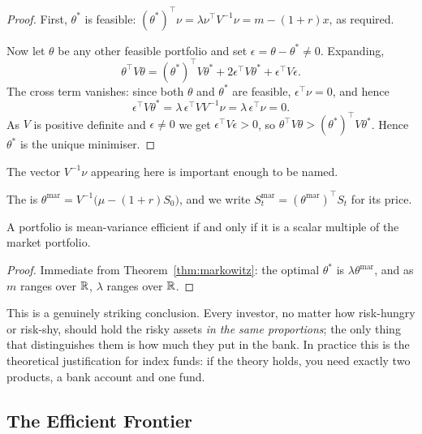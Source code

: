 \documentclass[a4paper]{scrartcl}
\begin{document}
\begin{proof}
	First, $\theta^*$ is feasible: $(\theta^*)^\top \nu = \lambda \nu^\top V^{-1}\nu = m - (1+r)x$, as required.

	Now let $\theta$ be any other feasible portfolio and set $\epsilon = \theta - \theta^* \neq 0$. Expanding,
	$$
	\theta^\top V \theta = (\theta^*)^\top V \theta^* + 2\epsilon^\top V \theta^* + \epsilon^\top V \epsilon.
	$$
	The cross term vanishes: since both $\theta$ and $\theta^*$ are feasible, $\epsilon^\top \nu = 0$, and hence
	$$
	\epsilon^\top V \theta^* = \lambda\, \epsilon^\top V V^{-1}\nu = \lambda\, \epsilon^\top \nu = 0.
	$$
	As $V$ is positive definite and $\epsilon \neq 0$ we get $\epsilon^\top V\epsilon > 0$, so $\theta^\top V\theta > (\theta^*)^\top V\theta^*$. Hence $\theta^*$ is the unique minimiser.
\end{proof}

The vector $V^{-1}\nu$ appearing here is important enough to be named.

\begin{definition}
	The  is $\theta^{\mathrm{mar}} = V^{-1}\big(\mu - (1+r)S_0\big)$, and we write $S_t^{\mathrm{mar}} = (\theta^{\mathrm{mar}})^\top S_t$ for its price.
\end{definition}

\begin{corollary}
	A portfolio is mean-variance efficient if and only if it is a scalar multiple of the market portfolio.
\end{corollary}

\begin{proof}
	Immediate from Theorem~\ref{thm:markowitz}: the optimal $\theta^*$ is $\lambda \theta^{\mathrm{mar}}$, and as $m$ ranges over $\mathbb{R}$, $\lambda$ ranges over $\mathbb{R}$.
\end{proof}

This is a genuinely striking conclusion. Every investor, no matter how risk-hungry or risk-shy, should hold the risky assets \emph{in the same proportions}; the only thing that distinguishes them is how much they put in the bank. In practice this is the theoretical justification for index funds: if the theory holds, you need exactly two products, a bank account and one fund.

\subsection{The Efficient Frontier}
\end{document}
